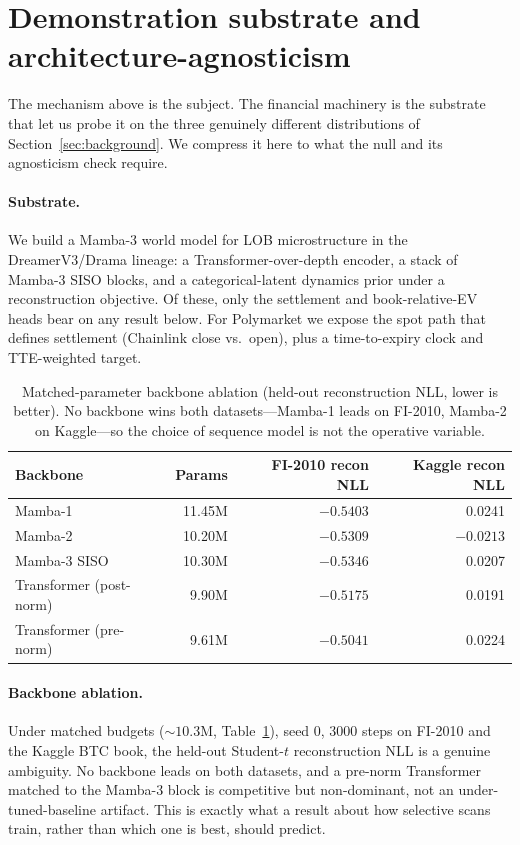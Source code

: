 \documentclass{article}
\begin{document}
\section{Demonstration substrate and architecture-agnosticism}\label{sec:substrate}
The mechanism above is the subject. The financial machinery is the substrate that let us probe it on the three genuinely different distributions of Section~\ref{sec:background}. We compress it here to what the null and its agnosticism check require.

\paragraph{Substrate.} We build a Mamba-3 world model for LOB microstructure in the DreamerV3/Drama lineage: a Transformer-over-depth encoder, a stack of Mamba-3 SISO blocks, and a categorical-latent dynamics prior under a reconstruction objective. Of these, only the settlement and book-relative-EV heads bear on any result below. For Polymarket we expose the spot path that defines settlement (Chainlink close vs.\ open), plus a time-to-expiry clock and TTE-weighted target.

\begin{table}[t]
\centering
\small
\begin{tabular}{lrrr}
\toprule
Backbone & Params & FI-2010 recon NLL & Kaggle recon NLL \\
\midrule
Mamba-1 & 11.45M & $-0.5403$ & 0.0241 \\
Mamba-2 & 10.20M & $-0.5309$ & $-0.0213$ \\
Mamba-3 SISO & 10.30M & $-0.5346$ & 0.0207 \\
Transformer (post-norm) & 9.90M & $-0.5175$ & 0.0191 \\
Transformer (pre-norm) & 9.61M & $-0.5041$ & 0.0224 \\
\bottomrule
\end{tabular}
\caption{Matched-parameter backbone ablation (held-out reconstruction NLL, lower is better). No backbone wins both datasets---Mamba-1 leads on FI-2010, Mamba-2 on Kaggle---so the choice of sequence model is not the operative variable.}
\label{tab:backbones}
\end{table}

\paragraph{Backbone ablation.} Under matched budgets ($\sim10.3$M, Table~\ref{tab:backbones}), seed 0, 3000 steps on FI-2010 and the Kaggle BTC book, the held-out Student-$t$ reconstruction NLL is a genuine ambiguity. No backbone leads on both datasets, and a pre-norm Transformer matched to the Mamba-3 block is competitive but non-dominant, not an under-tuned-baseline artifact. This is exactly what a result about how selective scans train, rather than which one is best, should predict.
\end{document}
